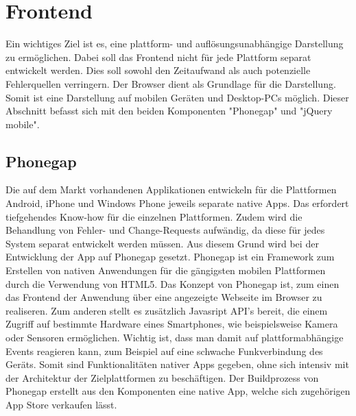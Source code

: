 \documentclass[10pt, conference, compsocconf]{IEEEtran}
\begin{document}
\section{Frontend}
Ein wichtiges Ziel ist es, eine plattform- und aufl\"osungsunabh\"angige Darstellung zu erm\"oglichen. 
Dabei soll das Frontend nicht f\"ur jede Plattform separat entwickelt werden.
Dies soll sowohl den Zeitaufwand als auch potenzielle Fehlerquellen verringern. 
Der Browser dient als Grundlage f\"ur die Darstellung. 
Somit ist eine Darstellung auf mobilen Ger\"aten und Desktop-PCs m\"oglich.
Dieser Abschnitt befasst sich mit den beiden Komponenten "Phonegap" und "jQuery mobile".

\subsection{Phonegap}
Die auf dem Markt vorhandenen Applikationen entwickeln f\"ur die Plattformen Android, iPhone und Windows Phone jeweils se\-parate native Apps. 
Das erfordert tiefgehendes Know-how f\"ur die einzelnen Plattformen. Zudem wird die Behandlung von Fehler- und Change-Requests aufw\"andig, da diese f\"ur jedes System separat entwickelt werden m\"ussen. 
Aus diesem Grund wird bei der Entwicklung der App auf Phonegap gesetzt. Phonegap ist ein Framework zum Erstellen von nativen Anwendungen f\"ur die g\"angigsten mobilen Plattformen durch die Verwendung von HTML5.
Das Konzept von Phonegap ist, zum einen das Frontend der Anwendung \"uber eine angezeigte Webseite im Browser zu realiseren. 
Zum anderen stellt es zus\"atzlich Javasript API's bereit, die einem Zugriff auf bestimmte Hardware eines Smartphones, wie beispielsweise Kamera oder Sensoren erm\"oglichen. 
Wichtig ist, dass man damit auf plattformabh\"angige Events reagieren kann, zum Beispiel auf eine schwache Funkverbindung des Ger\"ats. 
Somit sind Funktionalit\"aten nativer Apps gegeben, ohne sich intensiv mit der Architektur der Zielplattformen zu besch\"aftigen.
Der Buildprozess von Phonegap erstellt aus den Komponenten eine native App, welche sich zugeh\"origen App Store verkaufen l\"asst.
\end{document}
